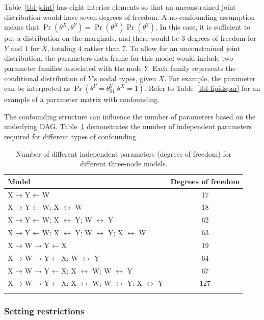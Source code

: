\documentclass[
  11pt,
  article]{jss}
\renewcommand{\texttt}[1]{\code{#1}}
\begin{document}
Table~\ref{tbl-joint} has eight interior elements so that an
unconstrained joint distribution would have seven degrees of freedom. A
no-confounding assumption means that
\(\Pr(\theta^X, \theta^Y) = \Pr(\theta^X)\Pr(\theta^Y)\). In this case,
it is sufficient to put a distribution on the marginals, and there would
be \(3\) degrees of freedom for \(Y\) and \(1\) for \(X\), totaling
\(4\) rather than \(7\). To allow for an unconstrained joint
distribution, the parameters data frame for this model would include two
parameter families associated with the node \(Y\). Each family
represents the conditional distribution of \(Y\)'s nodal types, given
\(X\). For example, the parameter \texttt{Y01\_X.1} can be interpreted
as \(\Pr(\theta^Y = \theta^Y_{01} | \theta^X=1)\). Refer to
Table~\ref{tbl-lipidspar} for an example of a parameter matrix with
confounding.

The confounding structure can influence the number of parameters based
on the underlying DAG. Table~\ref{tbl-dof} demonstrates the number of
independent parameters required for different types of confounding.

\begin{longtable}{lc}

\toprule
Model & Degrees of freedom\\
\midrule
X → Y ← W & 17\\
X → Y ← W; X $\leftrightarrow$ W & 18\\
X → Y ← W; X $\leftrightarrow$ Y; W $\leftrightarrow$ Y & 62\\
X → Y ← W; X $\leftrightarrow$ Y; W $\leftrightarrow$ Y; X $\leftrightarrow$ W & 63\\
X → W → Y ← X & 19\\
X → W → Y ← X; W $\leftrightarrow$ Y & 64\\
X → W → Y ← X; X $\leftrightarrow$ W; W $\leftrightarrow$ Y & 67\\
X → W → Y ← X; X $\leftrightarrow$ W; W $\leftrightarrow$ Y; X $\leftrightarrow$ Y & 127\\
\bottomrule


\caption{\label{tbl-dof}Number of different independent parameters
(degrees of freedom) for different three-node models.}

\tabularnewline
\end{longtable}

\subsubsection{Setting restrictions}\label{restrictions}
\end{document}
